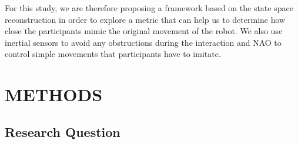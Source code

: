 \documentclass{sig-alternate-05-2015}
\begin{document}
For this study, we are therefore proposing a framework based on the state space reconstruction 
in order to explore a metric that can help us to determine 
how close the participants mimic the original movement of the robot.
We also use inertial sensors to avoid any obstructions during the interaction 
and NAO to control simple movements that participants have to imitate.












% 
% 
% 







\section{METHODS}

\subsection{Research Question}
\end{document}
